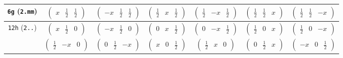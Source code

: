 \documentclass[fleqn,9pt,landscape]{jsarticle}
\begin{document}
\begin{center}
\begin{longtable}{ccccccc}
{\tt 6g} ({\tt 2.mm}) & $ \begin{pmatrix} x & \frac{1}{2} & \frac{1}{2} \end{pmatrix} $ & $ \begin{pmatrix} - x & \frac{1}{2} & \frac{1}{2} \end{pmatrix} $ & $ \begin{pmatrix} \frac{1}{2} & x & \frac{1}{2} \end{pmatrix} $ & $ \begin{pmatrix} \frac{1}{2} & - x & \frac{1}{2} \end{pmatrix} $ & $ \begin{pmatrix} \frac{1}{2} & \frac{1}{2} & x \end{pmatrix} $ & $ \begin{pmatrix} \frac{1}{2} & \frac{1}{2} & - x \end{pmatrix} $ \\ \hline
{\tt 12h} ({\tt 2..}) & $ \begin{pmatrix} x & \frac{1}{2} & 0 \end{pmatrix} $ & $ \begin{pmatrix} - x & \frac{1}{2} & 0 \end{pmatrix} $ & $ \begin{pmatrix} 0 & x & \frac{1}{2} \end{pmatrix} $ & $ \begin{pmatrix} 0 & - x & \frac{1}{2} \end{pmatrix} $ & $ \begin{pmatrix} \frac{1}{2} & 0 & x \end{pmatrix} $ & $ \begin{pmatrix} \frac{1}{2} & 0 & - x \end{pmatrix} $ \\
& $ \begin{pmatrix} \frac{1}{2} & - x & 0 \end{pmatrix} $ & $ \begin{pmatrix} 0 & \frac{1}{2} & - x \end{pmatrix} $ & $ \begin{pmatrix} x & 0 & \frac{1}{2} \end{pmatrix} $ & $ \begin{pmatrix} \frac{1}{2} & x & 0 \end{pmatrix} $ & $ \begin{pmatrix} 0 & \frac{1}{2} & x \end{pmatrix} $ & $ \begin{pmatrix} - x & 0 & \frac{1}{2} \end{pmatrix} $ \\ \hline

\end{longtable}
\end{center}
\end{document}
